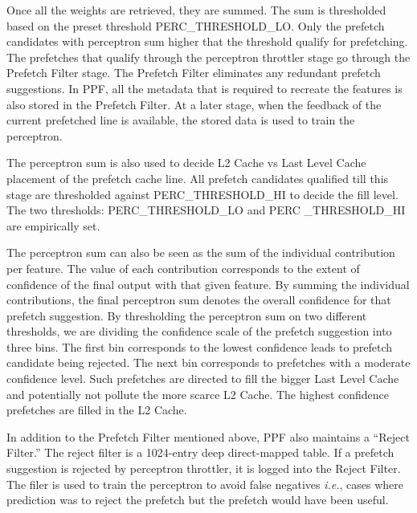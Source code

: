 Once all the weights are retrieved, they are summed.  The sum is thresholded
based on the preset threshold PERC\_THRESHOLD\_LO.  Only the prefetch
candidates with perceptron sum higher that the threshold qualify for
prefetching.  The prefetches that qualify through the perceptron throttler
stage go through the Prefetch Filter stage.  The Prefetch Filter eliminates
any redundant prefetch suggestions.  In PPF, all the metadata that is required
to recreate the features is also stored in the Prefetch Filter.  At a later
stage, when the feedback of the current prefetched line is available, the
stored data is used to train the perceptron.

The perceptron sum is also used to decide L2 Cache vs Last Level Cache
placement of the prefetch cache line.  All prefetch candidates qualified till
this stage are thresholded against PERC\_THRESHOLD\_HI to decide the fill
level. The two thresholds: PERC\_THRESHOLD\_LO and PERC \_THRESHOLD\_HI are
empirically set.

The perceptron sum can also be seen as the sum of the individual contribution
per feature.  The value of each contribution corresponds to the extent of
confidence of the final output with that given feature.  By summing the
individual contributions, the final perceptron sum denotes the overall
confidence for that prefetch suggestion.  By thresholding the perceptron sum
on two different thresholds, we are dividing the confidence scale of the
prefetch suggestion into three bins.  The first bin corresponds to the lowest
confidence leads to prefetch candidate being rejected.  The next bin
corresponds to prefetches with a moderate confidence level.  Such prefetches
are directed to fill the bigger Last Level Cache and potentially not pollute
the more scarce L2 Cache.  The highest confidence prefetches are filled in the
L2 Cache.

In addition to the Prefetch Filter mentioned above, PPF also maintains a
``Reject Filter.''  The reject filter is a 1024-entry deep direct-mapped
table.  If a prefetch suggestion is rejected by perceptron throttler, it is
logged into the Reject Filter.  The filer is used to train the perceptron to
avoid false negatives \textit{i.e.}, cases where prediction was to reject the
prefetch but the prefetch would have been useful.



